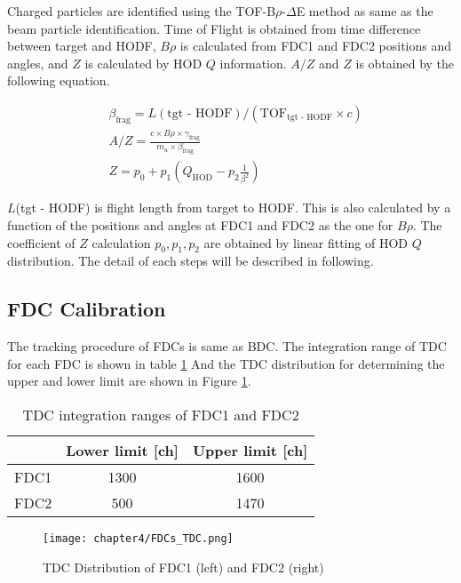 Charged particles are identified using the TOF-B$\rho$-$\Delta$E method as same as the beam particle identification. Time of Flight is obtained from time difference between target and HODF, $B\rho$ is calculated from FDC1 and FDC2 positions and angles, and $Z$ is calculated by HOD $Q$ information. $A/Z$ and $Z$ is obtained by the following equation.

\begin{align}
    &\beta_{\text{frag}} = L(\text{tgt - HODF}) / ( {\text{TOF}}_{\text{tgt - HODF}} \times c )\\
    &A/Z = \frac{c \times B\rho \times \gamma_{\text{frag}}} { m_u \times \beta_{\text{frag}}}\\
    &Z = p_0 + p_1 (Q_{\text{HOD}} - p_2 \frac{1}{\beta^2})
\end{align}

$L$(tgt - HODF) is flight length from target to HODF. This is also calculated by a function of the positions and angles at FDC1 and FDC2 as the one for $B\rho$. The coefficient of $Z$ calculation $p_0, p_1, p_2$ are obtained by linear fitting of HOD $Q$ distribution. The detail of each steps will be described in following.

\subsection{FDC Calibration}
The tracking procedure of FDCs is same as BDC. The integration range of TDC for each FDC is shown in table \ref{tab:TDC_FDCs} And the TDC distribution for determining the upper and lower limit are shown in Figure \ref{fig:TDC_FDCs}. 
\begin{table}[h]
    \centering
    \begin{tabular}{c|cc}
        \hline
        &Lower limit [ch]&Upper limit [ch]\\
        \hline
        FDC1&1300&1600\\
        FDC2&500&1470\\        
        \hline
    \end{tabular}
    \caption[TDC integration range of FDCs]{TDC integration ranges of FDC1 and FDC2}
    \label{tab:TDC_FDCs}
\end{table}

\begin{figure}
    \centering
    \texttt{[image: chapter4/FDCs\_TDC.png]}
    \caption[TDC Distribution of FDCs]{TDC Distribution of FDC1 (left) and FDC2 (right)}
    \label{fig:TDC_FDCs}
\end{figure}

